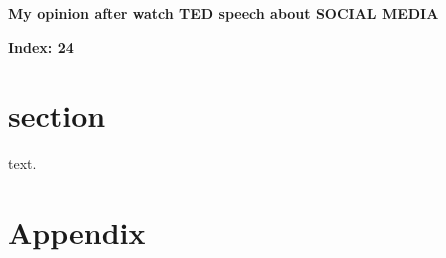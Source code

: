 \documentclass[UTF8,12pt,a4paper]{article}
\theoremstyle{Problem}
\theoremstyle{Solution}
\begin{document}
\thispagestyle{FirstPageStyle}
\begin{center}
    {\LARGE \textbf{My opinion after watch TED speech about SOCIAL MEDIA}} \\[0.5cm] %
\end{center}
\begin{center}
    {\LARGE \textbf{Index: 24}} \\[0.5cm] %
\end{center}
\section*{section}
text.
\section*{Appendix}
\end{document}
